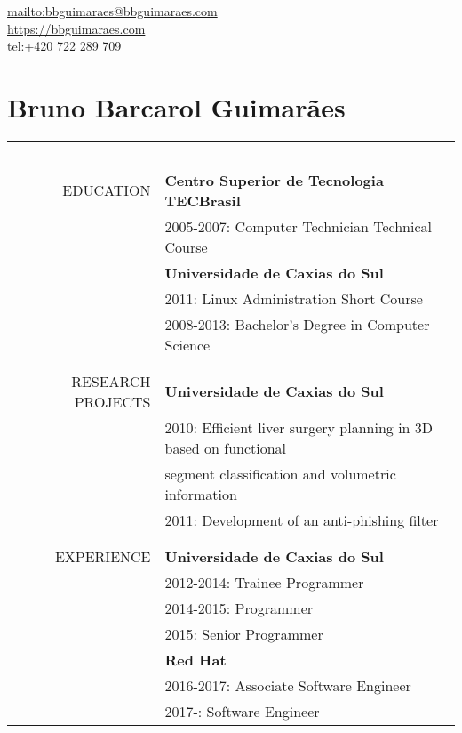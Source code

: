 \begin{flushright}
    \url{mailto:bbguimaraes@bbguimaraes.com} \\
    \url{https://bbguimaraes.com} \\
    \url{tel:+420 722 289 709}
\end{flushright}

\section*{Bruno Barcarol Guimarães}
\bigskip

\begin{center}

\begin{tabular}{rl}
    \multicolumn{2}{c}{~\hspace{.95\textwidth}~} \\
    \hspace{5em}
    \uppercase{Education}
    & \textbf{Centro Superior de Tecnologia TECBrasil} \\
    & 2005-2007: Computer Technician Technical Course \\
    & \textbf{Universidade de Caxias do Sul} \\
    & 2011: Linux Administration Short Course \\
    & 2008-2013: Bachelor's Degree in Computer Science
    \\\\ \hline \\
    \uppercase{Research projects}
    & \textbf{Universidade de Caxias do Sul} \\
    & 2010: Efficient liver surgery planning in 3D based on functional \\
    & \hphantom{2010: }segment classification and volumetric information \\
    & 2011: Development of an anti-phishing filter
    \\\\ \hline \\
    \uppercase{Experience}
    & \textbf{Universidade de Caxias do Sul} \\
    & 2012-2014: Trainee Programmer \\
    & 2014-2015: Programmer \\
    & 2015: Senior Programmer \\
    & \textbf{Red Hat} \\
    & 2016-2017: Associate Software Engineer \\
    & 2017-: Software Engineer

\end{tabular}
\end{center}
